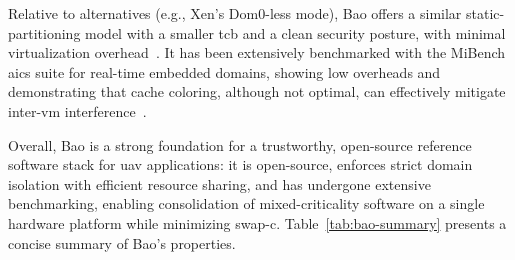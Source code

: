 Relative to alternatives (e.g., Xen’s Dom0-less mode), Bao offers a similar
static-partitioning model with a smaller \gls{tcb} and a clean security posture,
with minimal virtualization
overhead~\cite{martins_et_al:OASIcs:2020:11779}. It has been extensively
benchmarked with the MiBench \gls{aics} suite for real-time embedded domains,
showing low overheads and demonstrating that cache coloring, although not
optimal, can effectively mitigate inter-\gls{vm}
interference~\cite{martins2023shedding}.

Overall, Bao is a strong foundation for a trustworthy, open-source reference
software stack for \gls{uav} applications: it is open-source, enforces strict
domain isolation with efficient resource sharing, and has undergone extensive
benchmarking, enabling consolidation of mixed-criticality software on a single
hardware platform while minimizing \gls{swap-c}.%
Table~\ref{tab:bao-summary} presents a concise summary of Bao’s properties.



